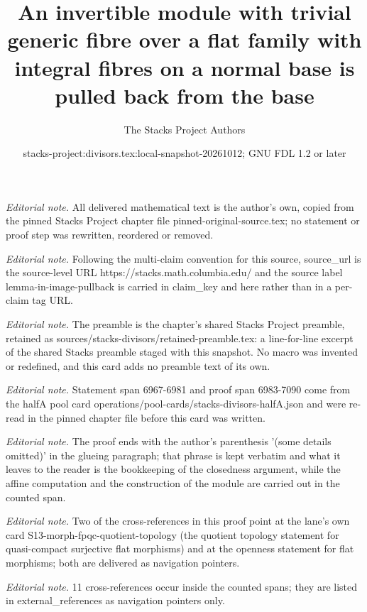 \documentclass[10pt,a4paper]{amsart}
\title{An invertible module with trivial generic fibre over a flat family with integral fibres on a normal base is pulled back from the base}
\author{The Stacks Project Authors}
\date{stacks-project:divisors.tex:local-snapshot-20261012; GNU FDL 1.2 or later}
\theoremstyle{plain}
\theoremstyle{definition}
\theoremstyle{remark}
\numberwithin{equation}{subsection}
\begin{document}
\maketitle
\noindent\textit{Editorial note.} All delivered mathematical text is the author's own, copied from the pinned Stacks Project chapter file pinned-original-source.tex; no statement or proof step was rewritten, reordered or removed.\par\medskip
\noindent\textit{Editorial note.} Following the multi-claim convention for this source, source\_url is the source-level URL https://stacks.math.columbia.edu/ and the source label lemma-in-image-pullback is carried in claim\_key and here rather than in a per-claim tag URL.\par\medskip
\noindent\textit{Editorial note.} The preamble is the chapter's shared Stacks Project preamble, retained as sources/stacks-divisors/retained-preamble.tex: a line-for-line excerpt of the shared Stacks preamble staged with this snapshot. No macro was invented or redefined, and this card adds no preamble text of its own.\par\medskip
\noindent\textit{Editorial note.} Statement span 6967-6981 and proof span 6983-7090 come from the halfA pool card operations/pool-cards/stacks-divisors-halfA.json and were re-read in the pinned chapter file before this card was written.\par\medskip
\noindent\textit{Editorial note.} The proof ends with the author's parenthesis '(some details omitted)' in the glueing paragraph; that phrase is kept verbatim and what it leaves to the reader is the bookkeeping of the closedness argument, while the affine computation and the construction of the module are carried out in the counted span.\par\medskip
\noindent\textit{Editorial note.} Two of the cross-references in this proof point at the lane's own card S13-morph-fpqc-quotient-topology (the quotient topology statement for quasi-compact surjective flat morphisms) and at the openness statement for flat morphisms; both are delivered as navigation pointers.\par\medskip
\noindent\textit{Editorial note.} 11 cross-references occur inside the counted spans; they are listed in external\_references as navigation pointers only.\par\medskip
\end{document}
